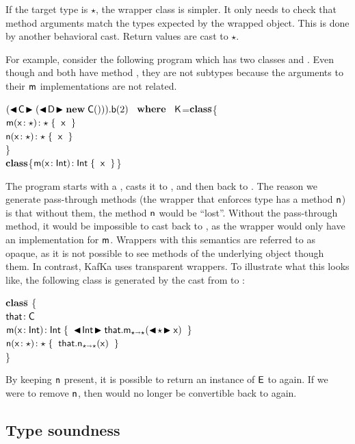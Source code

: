 \documentclass[a4paper,USenglish]{lipics-v2018}
\newcommand{\WHERE}{~\EM{\xt{\bf where}}~}
\newcommand{\HS}{\hspace{.2cm}}
\newcommand{\EM}[1]{\ensuremath{#1}\xspace}
\newcommand{\xt}[1]{{\sf{#1}}}
\newcommand{\bt}[1]{\xt{\bf #1}}
\newcommand{\EMxt}[1]{\EM{\xt{#1}}}
\newcommand{\x}{\EMxt x}
\newcommand{\n}{\EMxt n}
\newcommand{\m}{\EMxt m}
\newcommand{\K}{\EMxt K}
\newcommand{\E}{\EMxt {E}}
\newcommand{\any}{\EM{\star}}
\newcommand{\that}{\EMxt{that}}
\newcommand{\Call}[3]{\EM{#1.#2(#3)}}
\newcommand{\KCall}[5]{\EM{{#1}.{#2}_{{#4} \shortrightarrow {#5}}(#3)}}
\newcommand{\New}[2]{\EM{\new\;#1(#2)}}
\newcommand{\BehStart}{\EM{\blacktriangleleft}}
\newcommand{\BehEnd}{\EM{\blacktriangleright}}
\newcommand{\BehCast}[2]{\EM{\BehStart\! #1\! \BehEnd #2}}
\newcommand{\new}{\EM{\bt{new}}}
\newcommand{\HT}[2]{\EM{{#1}\!:{#2}}}
\newcommand{\Mdef}[5]{\EM{ \HT{ #1( \HT{#2}{#3})}{#4}\;\{{#5}\}}}
\newcommand{\class}{\EM{\bf{class}}}
\newcommand{\Fdef}[2]{\EM{ \HT{#1}{#2} }}
\newcommand{\kafka}{{\sf KafKa}\xspace}
\newcounter{lem}
\newcommand{\Int}{\xt{Int}}
\begin{document}
If the target type is \any, the wrapper class is simpler. It only needs to
check that method arguments match the types expected by the wrapped
object. This is done by another behavioral cast. Return values are cast to
\any.

For example, consider the following program which has two classes \C and \D.
Even though \C and \D both have method \a, they are not subtypes because the
arguments to their \m implementations are not related.

\begin{tabbing}\small
\hspace{1.5em}
\Call{(\BehCast\C{(\BehCast\D{\New\C{}})})}{\xt{b}}{2} \HS\HS\HS\WHERE\HS
\K\HS =\HS \= \class\= \C \{\\
\> \HS \Mdef\m\x\any\any{\HS\x\HS}\\
\> \HS \Mdef\n\x\any\any{\HS\x\HS}\\
\> \} \\
\>\class \D \{\HS \Mdef\m\x\Int\Int{\HS\x\HS}\HS \}
\end{tabbing}
The program starts with a \C, casts it to \D, and then back to \C. The
reason we generate pass-through methods (the wrapper that enforces type \D
has a method \n) is that without them, the method \n would be ``lost''. 
Without the pass-through method, it would be impossible to cast back to
\C, as the wrapper would only have an implementation for \m. Wrappers
with this semantics are referred to as opaque, as it is not possible
to see methods of the underlying object though them. In contrast,
\kafka uses transparent wrappers.
To illustrate what this looks like, the following class \xt E is generated
by the cast from \C to \D:

\begin{tabbing}\small
\hspace{1.5em}
\HS\HS\=\class\= \xt E \{\\
\>\> \HS \Fdef\that\C \\
\>\> \HS \Mdef\m\x\Int\Int{\HS\BehCast\Int{\KCall\that\m{\BehCast\any\x}\any\any\HS}} \\ 
\>\> \HS \Mdef\n\x\any\any{\HS \KCall\that\n{\x}\any\any\HS} \\ 
\>\}
\end{tabbing}
By keeping \n present, it is possible to return an instance of
\E to \C again. If we were to remove \n, then \xt E would no longer
be convertible back to \C again. 

\subsection{Type soundness}
\end{document}
